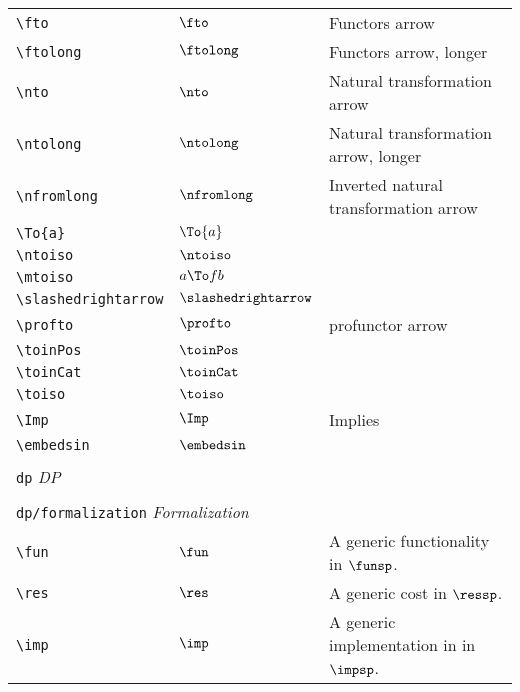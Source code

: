\begin{longtable}{lll}
 {\color[rgb]{0.5,0.5,0.5}\texttt{\textbackslash fto}} & $\fto$ &  Functors arrow\\ 
 {\color[rgb]{0.5,0.5,0.5}\texttt{\textbackslash ftolong}} & $\ftolong$ &  Functors arrow, longer\\ 
 {\color[rgb]{0.5,0.5,0.5}\texttt{\textbackslash nto}} & $\nto$ &  Natural transformation arrow\\ 
 {\color[rgb]{0.5,0.5,0.5}\texttt{\textbackslash ntolong}} & $\ntolong$ &  Natural transformation arrow, longer\\ 
 {\color[rgb]{0.5,0.5,0.5}\texttt{\textbackslash nfromlong}} & $\nfromlong$ &  Inverted natural transformation arrow\\ 
 {\color[rgb]{0.5,0.5,0.5}\texttt{\textbackslash To\{a\}}} & $\To{a}$ & \\ 
 {\color[rgb]{0.5,0.5,0.5}\texttt{\textbackslash ntoiso}} & $\ntoiso$ & \\ 
 {\color[rgb]{0.5,0.5,0.5}\texttt{\textbackslash mtoiso}} & $a \To f b$ & \\ 
 {\color[rgb]{0.5,0.5,0.5}\texttt{\textbackslash slashedrightarrow}} & $\slashedrightarrow$ & \\ 
 {\color[rgb]{0.5,0.5,0.5}\texttt{\textbackslash profto}} & $\profto$ &  profunctor arrow\\ 
 {\color[rgb]{0.5,0.5,0.5}\texttt{\textbackslash toinPos}} & $\toinPos$ & \\ 
 {\color[rgb]{0.5,0.5,0.5}\texttt{\textbackslash toinCat}} & $\toinCat$ & \\ 
 {\color[rgb]{0.5,0.5,0.5}\texttt{\textbackslash toiso}} & $\toiso$ & \\ 
 {\color[rgb]{0.5,0.5,0.5}\texttt{\textbackslash Imp}} & $\Imp$ &  Implies\\ 
 {\color[rgb]{0.5,0.5,0.5}\texttt{\textbackslash embedsin}} & $\embedsin$ & \\ 
  &  & \\ 
 \multicolumn{3}{l}{{\color[rgb]{0.5,0.5,0.5}\texttt{dp}} \emph{DP}}\\ 
 \hline
\hline
 &  & \\ 
 \multicolumn{3}{l}{{\color[rgb]{0.5,0.5,0.5}\texttt{dp/formalization}} \emph{Formalization}}\\ 
 \hline
{\color[rgb]{0.5,0.5,0.5}\texttt{\textbackslash fun}} & $\fun$ &  A generic functionality in $\funsp$.\\ 
 {\color[rgb]{0.5,0.5,0.5}\texttt{\textbackslash res}} & $\res$ &  A generic cost in $\ressp$.\\ 
 {\color[rgb]{0.5,0.5,0.5}\texttt{\textbackslash imp}} & $\imp$ &  A generic implementation in in $\impsp$.\\ 

\end{longtable}

